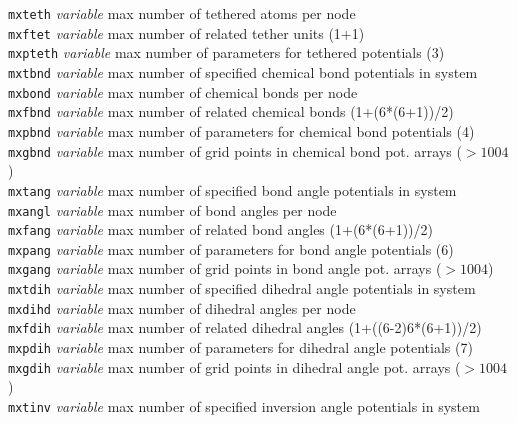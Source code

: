 \begin{tabbing}
\> {\tt mxteth}      \> {\em variable}       \> max number of tethered atoms per node \\
\> {\tt mxftet}      \> {\em variable}       \> max number of related tether units (1+1) \\
\> {\tt mxpteth}     \> {\em variable}       \> max number of parameters for tethered potentials (3) \\
\> {\tt mxtbnd}      \> {\em variable}       \> max number of specified chemical bond potentials in system \\
\> {\tt mxbond}      \> {\em variable}       \> max number of chemical bonds per node \\
\> {\tt mxfbnd}      \> {\em variable}       \> max number of related chemical bonds (1+(6*(6+1))/2) \\
\> {\tt mxpbnd}      \> {\em variable}       \> max number of parameters for chemical bond potentials (4) \\
\> {\tt mxgbnd}      \> {\em variable}       \> max number of grid points in chemical bond pot. arrays ($> 1004$) \\
\> {\tt mxtang}      \> {\em variable}       \> max number of specified bond angle potentials in system \\
\> {\tt mxangl}      \> {\em variable}       \> max number of bond angles per node \\
\> {\tt mxfang}      \> {\em variable}       \> max number of related bond angles (1+(6*(6+1))/2) \\
\> {\tt mxpang}      \> {\em variable}       \> max number of parameters for bond angle potentials (6) \\
\> {\tt mxgang}      \> {\em variable}       \> max number of grid points in bond angle pot. arrays ($> 1004$) \\
\> {\tt mxtdih}      \> {\em variable}       \> max number of specified dihedral angle potentials in system \\
\> {\tt mxdihd}      \> {\em variable}       \> max number of dihedral angles per node \\
\> {\tt mxfdih}      \> {\em variable}       \> max number of related dihedral angles (1+((6-2)6*(6+1))/2) \\
\> {\tt mxpdih}      \> {\em variable}       \> max number of parameters for dihedral angle potentials (7) \\
\> {\tt mxgdih}      \> {\em variable}       \> max number of grid points in dihedral angle pot. arrays ($> 1004$) \\
\> {\tt mxtinv}      \> {\em variable}       \> max number of specified inversion angle potentials in system \\

\end{tabbing}
